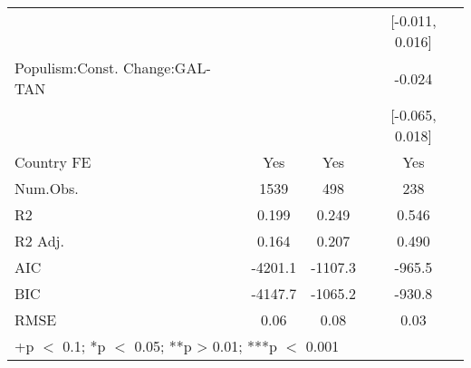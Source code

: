 \begin{table}
\begin{tabular}[t]{lccc}
 &  &  & {}[-0.011, 0.016]\\
Populism:Const. Change:GAL-TAN &  &  & -0.024\\
 &  &  & {}[-0.065, 0.018]\\
\midrule
Country FE & Yes & Yes & Yes\\
Num.Obs. & 1539 & 498 & 238\\
R2 & 0.199 & 0.249 & 0.546\\
R2 Adj. & 0.164 & 0.207 & 0.490\\
AIC & -4201.1 & -1107.3 & -965.5\\
BIC & -4147.7 & -1065.2 & -930.8\\
RMSE & 0.06 & 0.08 & 0.03\\
\bottomrule
\multicolumn{4}{l}{\rule{0pt}{1em}+p $<$ 0.1; *p $<$ 0.05; **p > 0.01; ***p $<$ 0.001}\\
\end{tabular}
\end{table}

